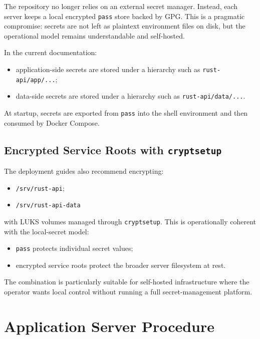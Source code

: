 \documentclass[11pt,a4paper]{article}
\begin{document}
The repository no longer relies on an external secret manager. Instead, each server keeps a local encrypted \texttt{pass} store backed by GPG. This is a pragmatic compromise: secrets are not left as plaintext environment files on disk, but the operational model remains understandable and self-hosted.

In the current documentation:

\begin{itemize}
  \item application-side secrets are stored under a hierarchy such as \texttt{rust-api/app/...};
  \item data-side secrets are stored under a hierarchy such as \texttt{rust-api/data/...}.
\end{itemize}

At startup, secrets are exported from \texttt{pass} into the shell environment and then consumed by Docker Compose.

\subsection{Encrypted Service Roots with \texttt{cryptsetup}}

The deployment guides also recommend encrypting:

\begin{itemize}
  \item \texttt{/srv/rust-api};
  \item \texttt{/srv/rust-api-data}
\end{itemize}

with LUKS volumes managed through \texttt{cryptsetup}. This is operationally coherent with the local-secret model:

\begin{itemize}
  \item \texttt{pass} protects individual secret values;
  \item encrypted service roots protect the broader server filesystem at rest.
\end{itemize}

The combination is particularly suitable for self-hosted infrastructure where the operator wants local control without running a full secret-management platform.

\section{Application Server Procedure}
\end{document}
